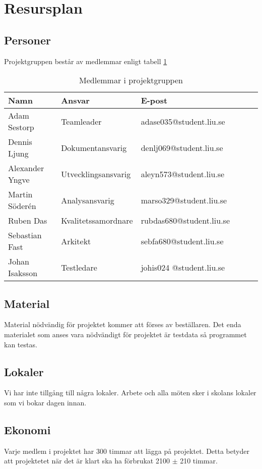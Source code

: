 \section{Resursplan}

\subsection{Personer}
Projektgruppen består av medlemmar enligt tabell \ref{projektplan:resursplan-personer}
\begin{table}[h]
	\centering
		\begin{tabularx}{\textwidth}{| l | l | X | l | l | l |}
			\hline
			\textbf{Namn} & \textbf{Ansvar} & \textbf{E-post} \\
			\hline
			{Adam Sestorp} & {Teamleader} & {adase035@student.liu.se} \\\hline
			{Dennis Ljung} & {Dokumentansvarig} & {denlj069@student.liu.se} \\\hline
			{Alexander Yngve} & {Utvecklingsansvarig} & {aleyn573@student.liu.se} \\\hline
			{Martin Söderén} & {Analysansvarig} & {marso329@student.liu.se} \\\hline
			{Ruben Das} & {Kvalitetssamordnare} & {rubdas680@student.liu.se} \\\hline
			{Sebastian Fast} & {Arkitekt} & {sebfa680@student.liu.se} \\\hline
			{Johan Isaksson } & {Testledare} & {johis024	@student.liu.se} \\\hline
		\end{tabularx}
	\caption{Medlemmar i projektgruppen} \label{projektplan:resursplan-personer}
\end{table}

\subsection{Material}
Material nödvändig för projektet kommer att förses av beställaren. Det enda materialet som anses vara nödvändigt för projektet är testdata så programmet kan testas.

\subsection{Lokaler}
Vi har inte tillgång till några lokaler. Arbete och alla möten sker i skolans lokaler som vi bokar dagen innan. 

\subsection{Ekonomi}
Varje medlem i projektet har 300 timmar att lägga på projektet. Detta betyder att projektetet när det är klart ska ha förbrukat 2100 $\pm $ 210 timmar.